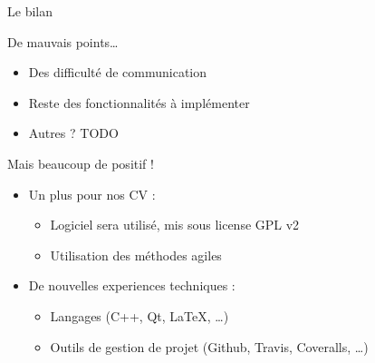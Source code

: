 \TsooSpeak{}
\begin{frame}{Le bilan} %
	\begin{alertblock}{De mauvais points…}
		\begin{itemize}
			\item Des difficulté de communication
			\item Reste des fonctionnalités à implémenter 
			\item Autres ? TODO %
		\end{itemize}
	\end{alertblock}
	\vfill
	\pause
	\begin{exampleblock}{Mais beaucoup de positif !}
		\begin{itemize}
			\item Un plus pour nos CV :
				\begin{itemize}
					\item Logiciel sera utilisé, mis sous license GPL v2
					\item Utilisation des méthodes agiles
				\end{itemize}
	
			\item De nouvelles experiences techniques :
				\begin{itemize}
					\item Langages (C++, Qt, \LaTeX{}, \ldots)
					\item Outils de gestion de projet (Github, Travis, Coveralls, \ldots)
				\end{itemize}
		\end{itemize}
	\end{exampleblock}

	\vfill
\end{frame}

